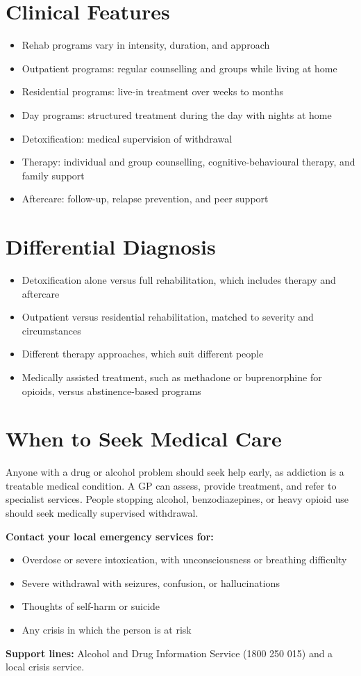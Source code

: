 \section*{Clinical Features}
\begin{itemize}
    \item Rehab programs vary in intensity, duration, and approach
    \item Outpatient programs: regular counselling and groups while living at home
    \item Residential programs: live-in treatment over weeks to months
    \item Day programs: structured treatment during the day with nights at home
    \item Detoxification: medical supervision of withdrawal
    \item Therapy: individual and group counselling, cognitive-behavioural therapy, and family support
    \item Aftercare: follow-up, relapse prevention, and peer support
\end{itemize}

\section*{Differential Diagnosis}
\begin{itemize}
    \item Detoxification alone versus full rehabilitation, which includes therapy and aftercare
    \item Outpatient versus residential rehabilitation, matched to severity and circumstances
    \item Different therapy approaches, which suit different people
    \item Medically assisted treatment, such as methadone or buprenorphine for opioids, versus abstinence-based programs
\end{itemize}

\section*{When to Seek Medical Care}
Anyone with a drug or alcohol problem should seek help early, as addiction is a treatable medical condition. A GP can assess, provide treatment, and refer to specialist services. People stopping alcohol, benzodiazepines, or heavy opioid use should seek medically supervised withdrawal.

\textbf{Contact your local emergency services for:}
\begin{itemize}
    \item Overdose or severe intoxication, with unconsciousness or breathing difficulty
    \item Severe withdrawal with seizures, confusion, or hallucinations
    \item Thoughts of self-harm or suicide
    \item Any crisis in which the person is at risk
\end{itemize}
\textbf{Support lines:} Alcohol and Drug Information Service (1800 250 015) and a local crisis service.

